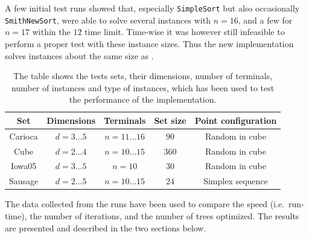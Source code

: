 A few initial test runs showed that, especially \texttt{SimpleSort} but also
occasionally \texttt{SmithNewSort}, were able to solve several instances with
$n=16$, and a few for $n=17$ within the $12$ time limit. Time-wise it was
however still infeasible to perform a proper test with these instance sizes.
Thus the new implementation solves instances about the same size as
\textcite{fonseca2014}.

\begin{table}[htbp]
  \centering
  \begin{tabular}{ccccc}
    \toprule
    Set     & Dimensions       & Terminals             & Set size & Point configuration \\
    \midrule
    Carioca & $d = 3 \ldots 5$ & $n = 11 \ldots 16$    & $90$     & Random in cube      \\
    Cube    & $d = 2 \ldots 4$ & $n = 10 \ldots 15$    & $360$    & Random in cube      \\
    Iowa05  & $d = 3 \ldots 5$ & $n = 10$              & $30$     & Random in cube      \\
    Sausage & $d = 2 \ldots 5$ & $n = 10 \ldots 15$    & $24$     & Simplex sequence    \\
    \bottomrule
  \end{tabular}
  \caption[Test sets used to test performance]{The table shows the tests sets,
    their dimensions, number of terminals, number of instances and type of instances,
    which has been used to test the performance of the implementation.\label{tab:test-sets}}
\end{table}

The data collected from the runs have been used to compare the speed (i.e.\
run-time), the number of iterations, and the number of trees optimized. The
results are presented and described in the two sections below.

